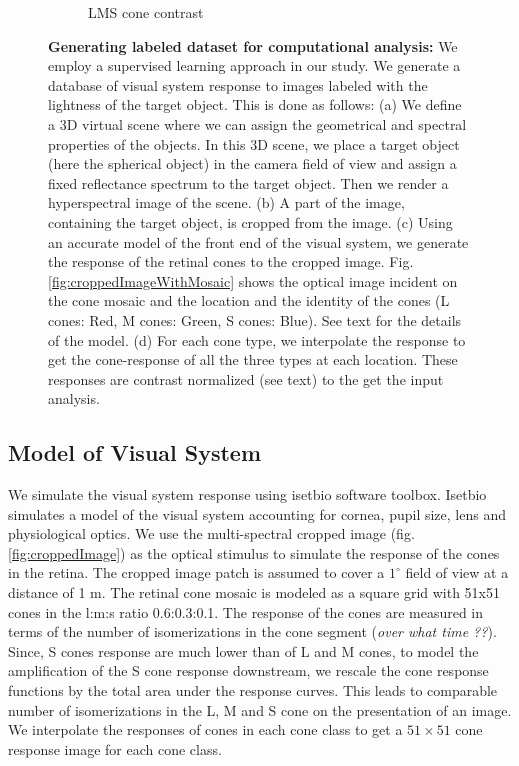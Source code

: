 \documentclass{jov}
\begin{document}
\begin{figure}
\begin{subfigure}[b]{0.2 \textwidth}
        \caption{LMS cone contrast}
        \label{fig:coneContrast}
    \end{subfigure}

    \label{fig:sceneWithCroppedImage}
    \caption{{\bf Generating labeled dataset for computational analysis:}  We employ a supervised learning approach in our study. We generate a database of visual system response to images labeled with the lightness of the target object. This is done as follows: (a) We define a 3D virtual scene where we can assign the geometrical and spectral properties of the objects. In this 3D scene, we place a target object (here the spherical object) in the camera field of view and assign a fixed reflectance spectrum to the target object. Then we render a hyperspectral image of the scene. (b) A part of the image, containing the target object, is cropped from the image. (c) Using an accurate model of the front end of the visual system, we generate the response of the retinal cones to the cropped image. Fig.\ref{fig:croppedImageWithMosaic} shows the optical image incident on the cone mosaic and the location and the identity of the cones (L cones: Red, M cones: Green, S cones: Blue). See text for the details of the model. (d) For each cone type, we interpolate the response to get the cone-response of all the three types at each location. These responses are contrast normalized (see text) to the get the input analysis.}
\end{figure}

\subsection{Model of Visual System} \label{method:Isetbio}
We simulate the visual system response using isetbio software toolbox. Isetbio simulates a model of the visual system accounting for cornea, pupil size, lens and physiological optics. We use the multi-spectral cropped image (fig.\ref{fig:croppedImage}) as the optical stimulus to simulate the response of the cones in the retina. The cropped image patch is assumed to cover a $1^{\circ}$ field of view at a distance of 1 m. The retinal cone mosaic is modeled as a square grid with 51x51 cones in the l:m:s ratio 0.6:0.3:0.1. The response of the cones are measured in terms of the number of isomerizations in the cone segment ({\it over what time ??}). Since, S cones response are much lower than of L and M cones, to model the amplification of the S cone response downstream, we rescale the cone response functions by the total area under the response curves. This leads to comparable number of isomerizations in the L, M and S cone on the presentation of an image. We interpolate the responses of cones in each cone class to get a $51 \times 51$ cone response image for each cone class.  
\end{document}
